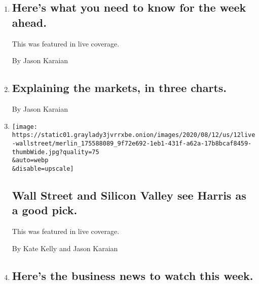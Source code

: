 \begin{enumerate}
\def\labelenumi{\arabic{enumi}.}
\item
  \href{/live/2020/08/17/business/stock-market-today-coronavirus/heres-what-you-need-to-know-for-the-week-ahead}{}

  \hypertarget{heres-what-you-need-to-know-for-the-week-ahead}{%
  \subsection{Here's what you need to know for the week
  ahead.}\label{heres-what-you-need-to-know-for-the-week-ahead}}

  This was featured in live coverage.

  By Jason Karaian
\item
  \href{/2020/08/13/business/explaining-the-markets-in-three-charts.html}{}

  \hypertarget{explaining-the-markets-in-three-charts}{%
  \subsection{Explaining the markets, in three
  charts.}\label{explaining-the-markets-in-three-charts}}

  By Jason Karaian
\item
  \href{/live/2020/08/12/us/biden-vs-trump/wall-street-and-silicon-valley-see-harris-as-a-good-pick}{}

  \texttt{[image: https://static01.graylady3jvrrxbe.onion/images/2020/08/12/us/12live-wallstreet/merlin\_175588089\_9f72e692-1eb1-431f-a62a-17b8bcaf8459-thumbWide.jpg?quality=75\\\&auto=webp\\\&disable=upscale]}

  \hypertarget{wall-street-and-silicon-valley-see-harris-as-a-good-pick}{%
  \subsection{Wall Street and Silicon Valley see Harris as a good
  pick.}\label{wall-street-and-silicon-valley-see-harris-as-a-good-pick}}

  This was featured in live coverage.

  By Kate Kelly and Jason Karaian
\item
  \href{/2020/08/10/business/heres-the-business-news-to-watch-this-week.html}{}

  \hypertarget{heres-the-business-news-to-watch-this-week}{%
  \subsection{Here's the business news to watch this
  week.}\label{heres-the-business-news-to-watch-this-week}}


\end{enumerate}
